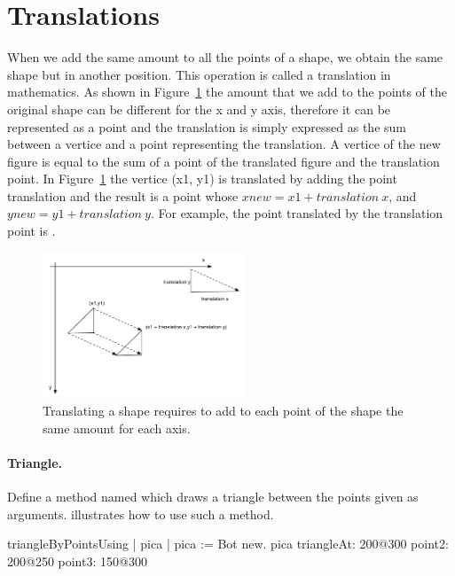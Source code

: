 \section{Translations}
When we add the same amount to all the points of a shape, we obtain the same shape but in another position. This operation is called a translation in mathematics. As shown in Figure~\ref{fig:translatedTriangleExplained} the amount that we add to the points of the original shape can be different for the x and y axis, therefore it can be represented as a point and the translation is simply expressed as the sum between a vertice and a point representing the translation. A vertice of the new figure is equal to the sum of a point of the translated figure and the translation point. 
In Figure~\ref{fig:translatedTriangleExplained} the vertice (x1, y1) is translated by adding
the point translation and the result is a point whose $xnew = x1 + translation\ x$, and $ynew = y1 + translation\ y$. For example,  the point  translated by the translation point  is . 

\begin{figure}
\begin{center}
\includegraphics[width=6cm]{translatedTriangleExplained}
\end{center}
\caption{Translating a shape requires to add to each point of the shape the same amount for each axis. \label{fig:translatedTriangleExplained}}
\end{figure}


\paragraph{Triangle.}
Define a method named  which draws a triangle between the points given as arguments.  illustrates how to use such a method.

\begin{scriptfig}{triangleByPoints}{Using }\label{scr:triangleUse}
| pica |
pica := Bot new.
pica  
   triangleAt: 200@300 
   point2: 200@250 
   point3: 150@300 
\end{scriptfig}


